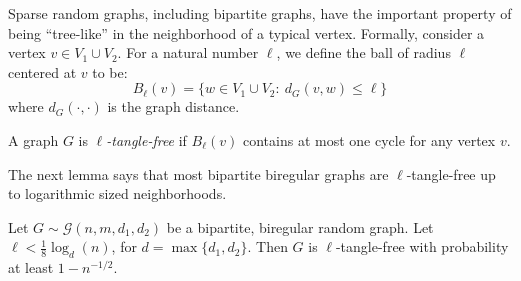 Sparse random graphs, including bipartite graphs,
have the important property of being ``tree-like''
in the neighborhood of a typical vertex. 
Formally, consider a vertex $v \in V_1 \cup V_2$. 
For a natural number $\ell$, 
we define the ball of radius $\ell$ centered at $v$ to be:
\[
B_{\ell}(v) = \{w \in V_1 \cup V_2 : ~ d_{G}(v,w) \leq \ell\}
\]
where $d_G(\cdot,\cdot)$ is the graph distance.
\begin{definition}
A graph $G$ is \textit{$\ell$-tangle-free} if
$B_{\ell}(v)$ contains at most one cycle for any vertex $v$.
\end{definition}

The next lemma says that most bipartite biregular graphs are $\ell$-tangle-free
up to logarithmic sized neighborhoods.
\begin{lemma}
Let $G \sim \mathcal{G}(n,m,d_1,d_2)$ be a bipartite, biregular random graph. 
Let $\ell < \frac{1}{8} \log_d (n)$, for $d=\max\{d_1, d_2\}$.
Then $G$ is $\ell$-tangle-free with probability at least $1-n^{-1/2}$.
\end{lemma}
